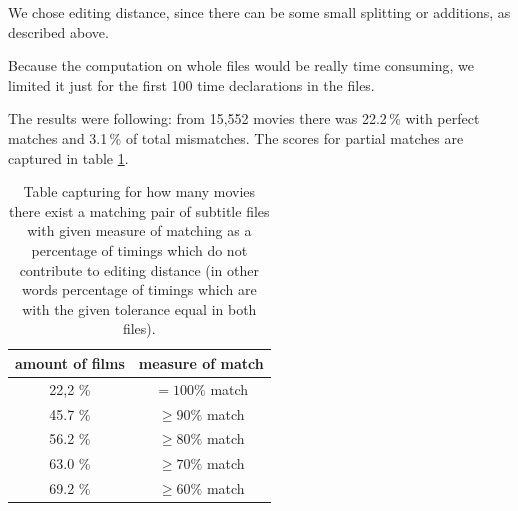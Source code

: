We chose editing distance, since there can be some small splitting or additions, as described above.

Because the computation on whole files would be really time consuming, we limited it just for the first 100 time declarations in the files.




The results were following: from 15,552 movies there was 22.2\,\%
with perfect matches and 3.1\,\% of total mismatches. The scores for partial matches are captured in table \ref{opensubtitles:matchTable}.

\begin{table}[h]

\begin{center}
\begin{tabular}{|c|c|}
\hline
amount of films & measure of match\\ \hline
22,2 \% & $= 100 \%$ match \\
45.7 \% & $\ge 90 \%$ match \\ 
56.2 \% & $\ge 80 \%$ match \\ 
63.0 \% & $\ge 70 \%$ match \\
69.2 \% & $\ge 60 \%$ match \\ \hline
\end{tabular}
\end{center}

\caption{Table capturing for how many movies there exist a matching pair of subtitle files with given measure of matching as a percentage of timings which do not contribute to editing distance (in other words percentage of timings which are with the given tolerance equal in both files).}\label{opensubtitles:matchTable}
\end{table}

